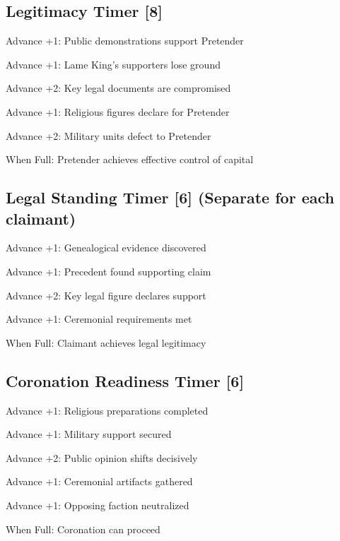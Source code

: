 \documentclass[11pt]{article}
\newenvironment{mechanics}{\begin{description}[leftmargin=*,style=standard]}{\end{description}}
\begin{document}
\subsection{Legitimacy Timer [8]}
\begin{mechanics}
\item[Advance +1:] Public demonstrations support Pretender
\item[Advance +1:] Lame King's supporters lose ground
\item[Advance +2:] Key legal documents are compromised
\item[Advance +1:] Religious figures declare for Pretender
\item[Advance +2:] Military units defect to Pretender
\item[When Full:] Pretender achieves effective control of capital
\end{mechanics}

\subsection{Legal Standing Timer [6] (Separate for each claimant)}
\begin{mechanics}
\item[Advance +1:] Genealogical evidence discovered
\item[Advance +1:] Precedent found supporting claim
\item[Advance +2:] Key legal figure declares support
\item[Advance +1:] Ceremonial requirements met
\item[When Full:] Claimant achieves legal legitimacy
\end{mechanics}

\subsection{Coronation Readiness Timer [6]}
\begin{mechanics}
\item[Advance +1:] Religious preparations completed
\item[Advance +1:] Military support secured
\item[Advance +2:] Public opinion shifts decisively
\item[Advance +1:] Ceremonial artifacts gathered
\item[Advance +1:] Opposing faction neutralized
\item[When Full:] Coronation can proceed
\end{mechanics}
\end{document}
